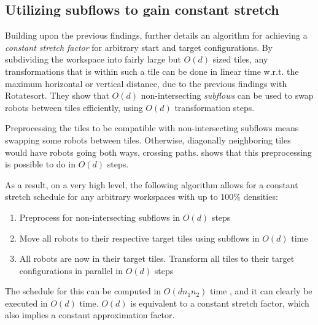 
\subsection{Utilizing subflows to gain constant stretch}

Building upon the previous findings, \cite{siamcomp/DemaineFKMS19} further details an algorithm for achieving a \emph{constant stretch factor} for arbitrary start and target configurations. 
By subdividing the workspace into fairly large but \(O(d)\) sized tiles, any transformations that is within such a tile can be done in linear time w.r.t.  the maximum horizontal or vertical distance, due to the previous findings with Rotatesort. 
They show that \(O(d)\) non-intersecting \emph{subflows} can be used to swap robots between tiles efficiently, using \(O(d)\) transformation steps.

Preprocessing the tiles to be compatible with non-intersecting subflows means swapping some robots between tiles. 
Otherwise, diagonally neighboring tiles would have robots going both ways, crossing paths. 
\cite{siamcomp/DemaineFKMS19} shows that this preprocessing is possible to do in \(O(d)\) steps. 

As a result, on a very high level, the following algorithm allows for a constant stretch schedule for any arbitrary workspaces with up to 100\% densities: 
\begin{enumerate}
	\item Preprocess for non-intersecting subflows in \(O(d)\) steps
	\item Move all robots to their respective target tiles using subflows in \(O(d)\) time
	\item All robots are now in their target tiles. Transform all tiles to their target configurations in parallel in \(O(d)\) steps
\end{enumerate}

The schedule for this can be computed in \(O(dn_1 n_2)\) time \cite{siamcomp/DemaineFKMS19}, and it can clearly be executed in \(O(d)\) time. 
\(O(d)\) is equivalent to a constant stretch factor, which also implies a constant approximation factor. 

